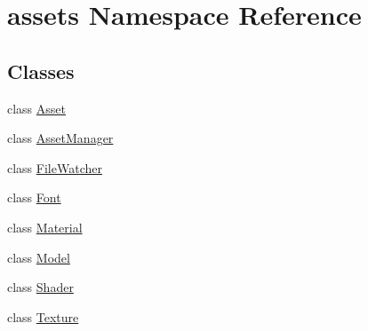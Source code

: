 \hypertarget{namespaceassets}{\section{assets Namespace Reference}
\label{namespaceassets}
}
\subsection*{Classes}
\begin{DoxyCompactItemize}
\item 
class \hyperlink{classassets_1_1Asset}{Asset}
\item 
class \hyperlink{classassets_1_1AssetManager}{Asset\-Manager}
\item 
class \hyperlink{classassets_1_1FileWatcher}{File\-Watcher}
\item 
class \hyperlink{classassets_1_1Font}{Font}
\item 
class \hyperlink{classassets_1_1Material}{Material}
\item 
class \hyperlink{classassets_1_1Model}{Model}
\item 
class \hyperlink{classassets_1_1Shader}{Shader}
\item 
class \hyperlink{classassets_1_1Texture}{Texture}
\end{DoxyCompactItemize}
